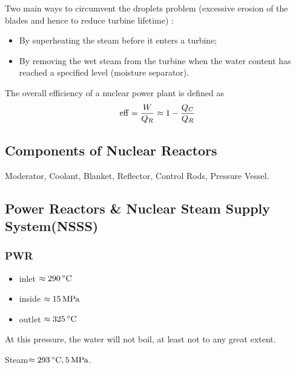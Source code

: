 Two main ways to circumvent the droplets problem (excessive erosion of the blades and hence to reduce turbine lifetime) :

\begin{itemize}
    \item By superheating the steam before it enters a turbine;
    \item By removing the wet steam from the turbine when the water content 
    has reached a specified level (moisture separator).
\end{itemize}

\begin{definition}
    The overall efficiency of a nuclear power plant is defined as
    \begin{equation}
        {\rm eff} = \frac{W}{Q_R} \approx 1 - \frac{Q_C}{Q_R}
    \end{equation}
\end{definition}

\subsection{Components of Nuclear Reactors}

Moderator, Coolant, Blanket, Reflector, Control Rods, Pressure Vessel.

\subsection{Power Reactors \& Nuclear Steam Supply System(NSSS)}

\subsubsection*{PWR}


\begin{itemize}
    \item inlet \quad $\approx 290\,{}^{\circ}{\rm C}$
    \item inside \quad $\approx 15\,{\rm MPa}$
    \item outlet \quad $\approx 325\,{}^{\circ}{\rm C}$
\end{itemize}

At this pressure, the water will not boil, at least not to any great extent.


Steam\quad $\approx 293\,{}^{\circ}{\rm C}, 5\,{\rm MPa}$.

